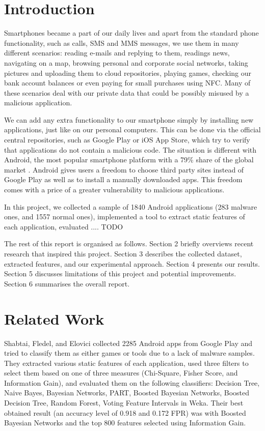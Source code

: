 \section{Introduction}
Smartphones became a part of our daily lives and apart from the standard phone functionality, such as calls, SMS and MMS messages, we use them in many different scenarios: reading e-mails and replying to them, readings news, navigating on a map, browsing personal and corporate social networks, taking pictures and uploading them to cloud repositories, playing games, checking our bank account balances or even paying for small purchases using NFC. Many of these scenarios deal with our private data that could be possibly misused by a malicious application.

We can add any extra functionality to our smartphone simply by installing new applications, just like on our personal computers. This can be done via the official central repositories, such as Google Play  \cite{google_play} or iOS App Store, which try to verify that applications do not contain a malicious code. The situation is different with Android, the most popular smartphone platform with a 79\% share of the global market \cite{idc}. Android gives users a freedom to choose third party sites instead of Google Play as well as to install a manually downloaded apps. This freedom comes with a price of a greater vulnerability to malicious applications.

In this project, we collected a sample of 1840 Android applications (283 malware ones, and 1557 normal ones), implemented a tool to extract static features of each application, evaluated .... TODO

The rest of this report is organised as follows. Section 2 briefly overviews recent research that inspired this project. Section 3 describes the collected dataset, extracted features, and our experimental approach. Section 4 presents our results. Section 5 discusses limitations of this project and potential improvements. Section 6 summarises the overall report.

\section{Related Work}
Shabtai, Fledel, and Elovici \cite{shabtai_2010} collected 2285 Android apps from Google Play and tried to classify them as either games or tools due to a lack of malware samples. They extracted various static features of each application, used three filters to select them based on one of three measures (Chi-Square, Fisher Score, and Information Gain), and evaluated them on the following classifiers: Decision Tree, Naive Bayes, Bayesian Networks, PART, Boosted Bayesian Networks, Boosted Decision Tree, Random Forest, Voting Feature Intervals in Weka. Their best obtained result (an accuracy level of 0.918 and 0.172 FPR) was with Boosted Bayesian Networks and the top 800 features selected using Information Gain.

